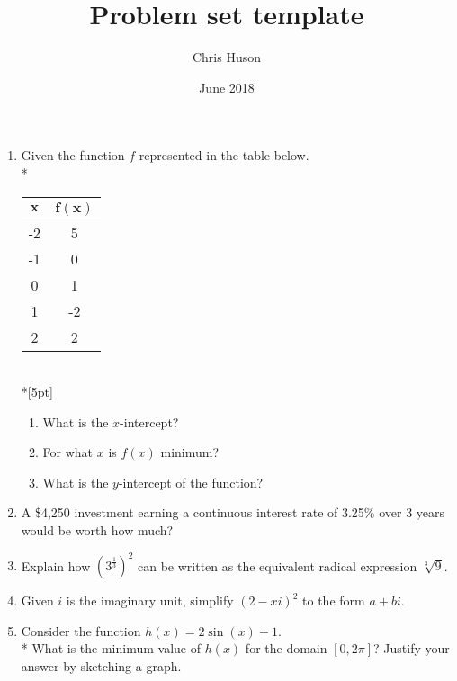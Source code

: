 \documentclass[12pt, oneside]{article}
\title{Problem set template}
\author{Chris Huson}
\date{June 2018}
\begin{document}
\begin{enumerate}

\item Given the function $f$ represented in the table below.\\*
\begin{center}
\begin{tabular}{|c|c|}
    \hline 
    $\boldsymbol{x}$ & $\boldsymbol{f(x)}$\\ 
    \hline 
    -2 & 5 \\ 
    \hline 
    -1 & 0 \\ 
    \hline 
    0 & 1 \\ 
    \hline 
    1 & -2 \\ 
    \hline 
    2 & 2 \\ 
    \hline 
\end{tabular}\\*[5pt]
\end{center}
\begin{enumerate}
    \item What is the $x$-intercept?\\[25pt]
    \item For what $x$ is $f(x)$ minimum?\\[25pt]
    \item What is the $y$-intercept of the function?\\[15pt]
\end{enumerate}

\newpage

\item A \$4,250 investment earning a continuous interest rate of 3.25\% over 3 years would be worth how much?\\[2in]


\item Explain how $\displaystyle \left(3^{\frac{1}{3}} \right)^2$ can be written as the equivalent radical expression $\sqrt[3]9$. \\[3in] %

\item Given $i$ is the imaginary unit, simplify $(2-xi)^2$ to the form $a+bi$. \\[1.8in]%

\newpage
\item Consider the function $h(x) = 2\sin(x) + 1$.\\*
What is the minimum value of $h(x)$ for the domain $[0,2\pi]$? Justify your answer by sketching a graph. \\[2in]%



\end{enumerate}
\end{document}
